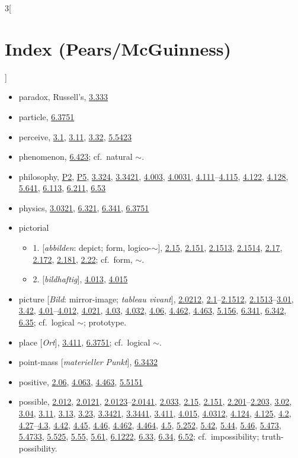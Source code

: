 \documentclass[oneside,openany,12pt]{book}
\newcommand{\indexentry}[1]{\item #1}
\newcommand{\indexsubentry}[1]{\begin{itemize} \item #1 \end{itemize}}
\newcommand{\indexref}[1]{\hyperlink{prop#1}{#1}}
\newcommand{\indexgap}{\bigskip}
\begin{document}
\begin{multicols}{3}[\section*{Index (Pears/McGuinness)}]
\begin{itemize}
\indexgap

\indexentry{paradox, Russell's, \indexref{3.333}}

\indexentry{particle, \indexref{6.3751}}

\indexentry{perceive, \indexref{3.1}, \indexref{3.11}, \indexref{3.32}, \indexref{5.5423}}

\indexentry{phenomenon, \indexref{6.423}; cf.\ natural $\sim$.}

\indexentry{philosophy, \hyperlink{pref2}{P2}, \hyperlink{pref5}{P5}, \indexref{3.324}, \indexref{3.3421}, \indexref{4.003}, \indexref{4.0031}, \indexref{4.111}--\indexref{4.115}, \indexref{4.122}, \indexref{4.128}, \indexref{5.641}, \indexref{6.113}, \indexref{6.211}, \indexref{6.53}}

\indexentry{physics, \indexref{3.0321}, \indexref{6.321}, \indexref{6.341}, \indexref{6.3751}}

\indexentry{pictorial}

   \indexsubentry{1. [\textit{abbilden}: depict; form, logico-$\sim$], \indexref{2.15}, \indexref{2.151}, \indexref{2.1513}, \indexref{2.1514}, \indexref{2.17}, \indexref{2.172}, \indexref{2.181}, \indexref{2.22}; cf.\ form, $\sim$.}

   \indexsubentry{2. [\textit{bildhaftig}], \indexref{4.013}, \indexref{4.015}}

\indexentry{picture [\textit{Bild}: mirror-image; \textit{tableau vivant}], \indexref{2.0212}, \indexref{2.1}--\indexref{2.1512}, \indexref{2.1513}--\indexref{3.01}, \indexref{3.42}, \indexref{4.01}--\indexref{4.012}, \indexref{4.021}, \indexref{4.03}, \indexref{4.032}, \indexref{4.06}, \indexref{4.462}, \indexref{4.463}, \indexref{5.156}, \indexref{6.341}, \indexref{6.342}, \indexref{6.35}; cf.\ logical $\sim$; prototype.}

\indexentry{place [\textit{Ort}], \indexref{3.411}, \indexref{6.3751}; cf.\ logical $\sim$.}

\indexentry{point-mass [\textit{materieller Punkt}], \indexref{6.3432}}

\indexentry{positive, \indexref{2.06}, \indexref{4.063}, \indexref{4.463}, \indexref{5.5151}}

\indexentry{possible, \indexref{2.012}, \indexref{2.0121}, \indexref{2.0123}--\indexref{2.0141}, \indexref{2.033}, \indexref{2.15}, \indexref{2.151}, \indexref{2.201}--\indexref{2.203}, \indexref{3.02}, \indexref{3.04}, \indexref{3.11}, \indexref{3.13}, \indexref{3.23}, \indexref{3.3421}, \indexref{3.3441}, \indexref{3.411}, \indexref{4.015}, \indexref{4.0312}, \indexref{4.124}, \indexref{4.125}, \indexref{4.2}, \indexref{4.27}--\indexref{4.3}, \indexref{4.42}, \indexref{4.45}, \indexref{4.46}, \indexref{4.462}, \indexref{4.464}, \indexref{4.5}, \indexref{5.252}, \indexref{5.42}, \indexref{5.44}, \indexref{5.46}, \indexref{5.473}, \indexref{5.4733}, \indexref{5.525}, \indexref{5.55}, \indexref{5.61}, \indexref{6.1222}, \indexref{6.33}, \indexref{6.34}, \indexref{6.52}; cf.\ impossibility; truth-possibility.}


\end{itemize}
\end{multicols}
\end{document}

